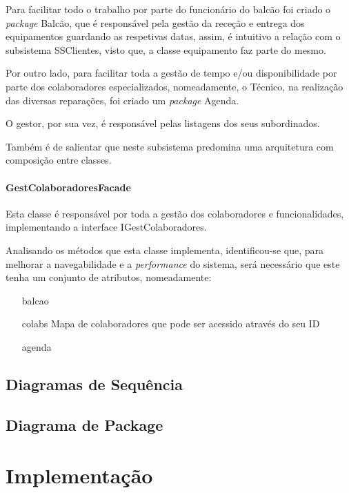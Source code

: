 \documentclass[a4paper,12pt]{scrreprt}
\begin{document}
Para facilitar todo o trabalho por parte do funcionário do balcão foi criado o \textit{package} Balcão, que é responsável pela gestão da
receção e entrega dos equipamentos guardando as respetivas datas, assim, é intuitivo a relação com o subsistema SSClientes, visto que,
a classe equipamento faz parte do mesmo.

Por outro lado, para facilitar toda a gestão de tempo e/ou disponibilidade por parte dos colaboradores especializados, nomeadamente, o Técnico, na realização das 
diversas reparações, foi criado um \textit{package} Agenda. 

O gestor, por sua vez, é responsável pelas listagens dos seus subordinados.

Também é de salientar que neste subsistema predomina uma arquitetura com composição entre classes.

\subsubsection{GestColaboradoresFacade}
Esta classe é responsável por toda a gestão dos colaboradores e funcionalidades, implementando a interface IGestColaboradores.

Analisando os métodos que esta classe implementa, identificou-se que, para melhorar a navegabilidade
e a \textit{performance} do sistema, será necessário que este tenha um conjunto de atributos, nomeadamente:
\begin{itemize}
    \item [balcao]
    \item [colabs]{Mapa de colaboradores que pode ser acessido através do seu ID}
    \item [agenda]
\end{itemize}




\section{Diagramas de Sequência} \label{sec:diagrama_sequencia}


\section{Diagrama de Package} \label{sec:diagrama_package}


\chapter{Implementação} \label{chap:implementacao}

\end{document}
